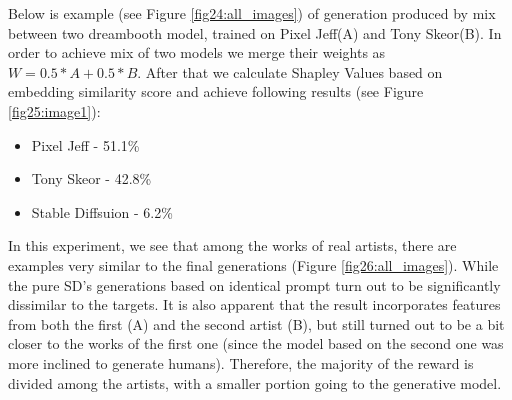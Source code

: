 \documentclass[12pt, letterpaper]{article}
\begin{document}
Below is example (see Figure \ref{fig24:all_images}) of generation produced by mix between two dreambooth model, trained on Pixel Jeff(A) and  Tony Skeor(B). In order to achieve mix of two models we merge their weights as \(W = 0.5 * A + 0.5 * B\). After that we calculate Shapley Values based on embedding similarity score and achieve following results (see Figure \ref{fig25:image1}):
\begin{itemize}[itemsep=0pt,topsep=5pt,partopsep=0pt]
    \item Pixel Jeff - 51.1\%
    \item Tony Skeor - 42.8\%
    \item Stable Diffsuion - 6.2\%
\end{itemize}

In this experiment, we see that among the works of real artists, there are examples very similar to the final generations (Figure \ref{fig26:all_images}). While the pure SD's generations based on identical prompt turn out to be significantly dissimilar to the targets. It is also apparent that the result incorporates features from both the first (A) and the second artist (B), but still turned out to be a bit closer to the works of the first one (since the model based on the second one was more inclined to generate humans). Therefore, the majority of the reward is divided among the artists, with a smaller portion going to the generative model.
\end{document}
